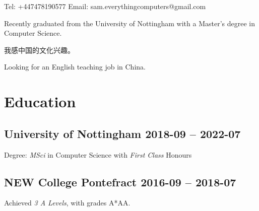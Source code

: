 \documentclass[cv.tex]{subfiles}
\begin{document}
\title{}
\author{Sam Robert Whitehead}

\maketitle

\pagestyle{empty}
\thispagestyle{empty}

Tel:
+447478190577
\hfill
Email:
sam.everythingcomputers@gmail.com

\vspace{2mm}
Recently graduated from the University of Nottingham with a Master's degree in
Computer Science.

我感中国的文化兴趣。

Looking for an English teaching job in China.
\section{Education}
    \subsection{University of Nottingham
        \hfill 2018-09 -- 2022-07}
        Degree: \emph{MSci} in Computer Science with \emph{First Class} Honours
    \subsection{NEW College Pontefract
        \hfill 2016-09 -- 2018-07}
        Achieved \emph{3 A Levels}, with grades
        A*AA\footnotemark[2].
\end{document}
